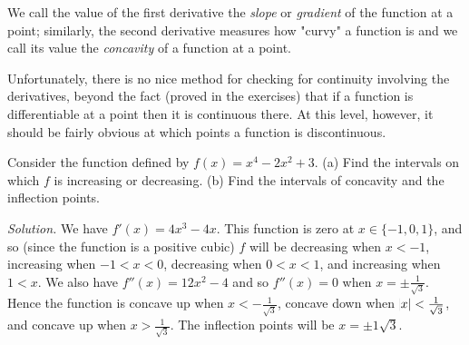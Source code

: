 We call the value of the first derivative the \textit{slope} or \textit{gradient} of the function at a point; similarly,
the second derivative measures how "curvy" a function is and we call its value the \textit{concavity} of a function
at a point.

Unfortunately, there is no nice method for checking for continuity involving the derivatives, beyond the fact (proved in the exercises)
that if a function is differentiable at a point then it is continuous there. At this level, however, it should be fairly obvious at which
points a function is discontinuous.

\begin{ex}
  Consider the function defined by $ f(x) = x^4 - 2x^2 + 3 $. (a) Find the intervals on which $ f $
  is increasing or decreasing. (b) Find the intervals of concavity and the inflection points.

  \textit{Solution.} We have $ f'(x) = 4x^3 - 4x $. This function is zero at $ x \in \{-1, 0, 1\} $, and so (since the function
  is a positive cubic) $ f $ will be decreasing when $ x < -1 $, increasing when $ -1 < x < 0 $, decreasing when $ 0 < x < 1 $,
  and increasing when $ 1 < x $. We also have $ f''(x) = 12x^2 - 4 $ and so $ f''(x) = 0 $ when $ x = \pm \frac{1}{\sqrt{3}} $.
  Hence the function is concave up when $ x < -\frac{1}{\sqrt{3}} $, concave down when $ \abs{x} < \frac{1}{\sqrt{3}} $, and concave
  up when $ x > \frac{1}{\sqrt{3}} $. The inflection points will be $ x = \pm{1}{\sqrt{3}} $.
  \begin{center}
  \end{center}
\end{ex}

\clearpage
